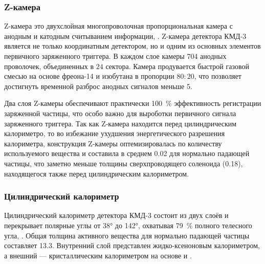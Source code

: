 \subsubsection{Z-камера}

Z-камера это двухслойная многопроволочная пропорциональная камера с анодным и катодным считыванием информации, \cite{Anashkin1992}.
Z-камера детектора КМД-3 является не только координатным детектором,
но и одним из основных элементов первичного заряженного триггера.
В каждом слое камеры \num{704} анодных проволочек, объединенных в $24$ сектора.
Камера продувается быстрой газовой смесью на основе фреона-14  и изобутана  в пропорции $80:20$,
что позволяет достигнуть временной разброс анодных сигналов меньше \SI{5}{\nsr}.

Два слоя Z-камеры обеспечивают практически \SI{100}{\percent} эффективность регистрации заряженной частицы,
что особо важно для выроботки первичного сигнала заряженного триггера.
Так как Z-камера находится перед цилиндрическим калориметро,
то во избежание ухудшения энергетического разрешения калориметра,
конструкция Z-камеры оптемизировалась по количеству используемого вещества и составила в среднем \SI{0.02}{\Xrad} для нормально падающей частицы,
что заметно меньше толщины сверхпроводящего соленоида (\SI{0.18}{\Xrad}),
находящегося также перед цилиндрическим калориметром.


\subsubsection{Цилиндрический калориметр}\label{sel:barrel_calorimeter}

Цилиндрический калориметр детектора КМД-3 состоит из двух слоёв и перекрывает полярные углы от \ang{38} до \ang{142},
охватывая \SI{79}{\percent} полного телесного угла,
\cite{BarrelCalCMD3Anisenkov:2013yva}.
Общая толщина активного вещества для нормально падающей частицы составляет \SI{13.3}{\Xrad}.
Внутренний слой представлен жидко-ксеноновым калориметром,
а внешний
---
кристаллическим калориметром на основе  и .

